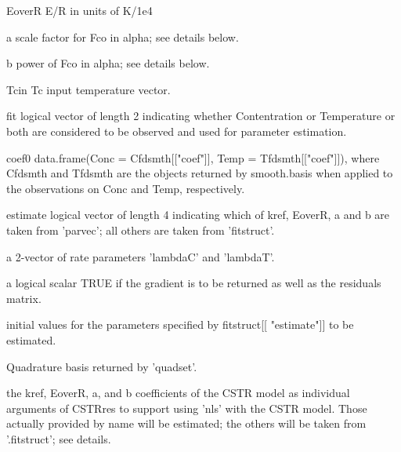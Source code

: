 \begin{Arguments}
\begin{ldescription}
{\item[EoverR] E/R in units of K/1e4 

\item[a] scale factor for Fco in alpha;  see details below.

\item[b] power of Fco in alpha;  see details below.

\item[Tcin] Tc input temperature vector.

\item[fit] logical vector of length 2 indicating whether Contentration or
Temperature or both are considered to be observed and used for
parameter estimation. 

\item[coef0] data.frame(Conc = Cfdsmth[["coef"]], Temp = Tfdsmth[["coef"]]),
where Cfdsmth and Tfdsmth are the objects returned by
smooth.basis when applied to the observations on Conc and Temp,
respectively.  

\item[estimate] logical vector of length 4 indicating which of kref, EoverR, a
and b are taken from 'parvec';  all others are taken from
'fitstruct'.  

}

\item[\code{lambda}] a 2-vector of rate parameters 'lambdaC' and 'lambdaT'.  

\item[\code{gradwrd}] a logical scalar TRUE if the gradient is to be returned as well as
the residuals matrix.      

\item[\code{parvec, par}] initial values for the parameters specified by fitstruct[[
"estimate"]] to be estimated. 

\item[\code{CSTRbasis}] Quadrature basis returned by 'quadset'.  

\item[\code{kref, EoverR, a, b}] the kref, EoverR, a, and b coefficients of the CSTR model as
individual arguments of CSTRres to support using 'nls' with the CSTR
model.  Those actually provided by name will be estimated;  the
others will be taken from '.fitstruct';  see details.   

\end{ldescription}
\end{Arguments}
